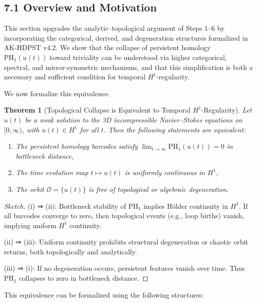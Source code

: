\documentclass[11pt]{article}
\newtheorem{theorem}{Theorem}[section]
\theoremstyle{definition}
\begin{document}
\subsection*{7.1 Overview and Motivation}

This section upgrades the analytic--topological argument of Steps 1--6 by incorporating the categorical, derived, and degeneration structures formalized in AK-HDPST v4.2. We show that the collapse of persistent homology $\mathrm{PH}_1(u(t))$ toward triviality can be understood via higher categorical, spectral, and mirror-symmetric mechanisms, and that this simplification is both a necessary and sufficient condition for temporal $H^1$-regularity.

We now formalize this equivalence.

\begin{theorem}[Topological Collapse is Equivalent to Temporal $H^1$-Regularity]
Let \( u(t) \) be a weak solution to the 3D incompressible Navier--Stokes equations on \( [0, \infty) \), with \( u(t) \in H^1 \) for all \( t \). Then the following statements are equivalent:
\begin{enumerate}
    \item[\textbf{(i)}] The persistent homology barcodes satisfy \( \lim_{t \to \infty} \mathrm{PH}_1(u(t)) = 0 \) in bottleneck distance,
    \item[\textbf{(ii)}] The time evolution map \( t \mapsto u(t) \) is uniformly continuous in \( H^1 \),
    \item[\textbf{(iii)}] The orbit \( \mathcal{O} = \{ u(t) \} \) is free of topological or algebraic degeneration.
\end{enumerate}
\end{theorem}

\begin{proof}[Sketch]
(i) ⇒ (ii): Bottleneck stability of $\mathrm{PH}_1$ implies Hölder continuity in $H^1$. If all barcodes converge to zero, then topological events (e.g., loop births) vanish, implying uniform $H^1$ continuity.

(ii) ⇒ (iii): Uniform continuity prohibits structural degeneration or chaotic orbit returns, both topologically and analytically.

(iii) ⇒ (i): If no degeneration occurs, persistent features vanish over time. Thus $\mathrm{PH}_1$ collapses to zero in bottleneck distance.
\end{proof}

This equivalence can be formalized using the following structures:
\end{document}
